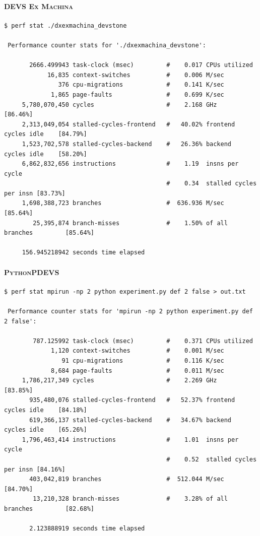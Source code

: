 \documentclass[8pt,a4paper]{report}
\begin{document}
\paragraph{\textsc{DEVS Ex Machina}}
\begin{Verbatim}[fontsize=\small]
$ perf stat ./dxexmachina_devstone 

 Performance counter stats for './dxexmachina_devstone':

       2666.499943 task-clock (msec)         #    0.017 CPUs utilized          
            16,835 context-switches          #    0.006 M/sec                  
               376 cpu-migrations            #    0.141 K/sec                  
             1,865 page-faults               #    0.699 K/sec                  
     5,780,070,450 cycles                    #    2.168 GHz                     [86.46%]
     2,313,049,054 stalled-cycles-frontend   #   40.02% frontend cycles idle    [84.79%]
     1,523,702,578 stalled-cycles-backend    #   26.36% backend  cycles idle    [58.20%]
     6,862,832,656 instructions              #    1.19  insns per cycle        
                                             #    0.34  stalled cycles per insn [83.73%]
     1,698,388,723 branches                  #  636.936 M/sec                   [85.64%]
        25,395,874 branch-misses             #    1.50% of all branches         [85.64%]

     156.945218942 seconds time elapsed
\end{Verbatim}
\paragraph{\textsc{PythonPDEVS}}
\begin{Verbatim}[fontsize=\small]
$ perf stat mpirun -np 2 python experiment.py def 2 false > out.txt

 Performance counter stats for 'mpirun -np 2 python experiment.py def 2 false':

        787.125992 task-clock (msec)         #    0.371 CPUs utilized          
             1,120 context-switches          #    0.001 M/sec                  
                91 cpu-migrations            #    0.116 K/sec                  
             8,684 page-faults               #    0.011 M/sec                  
     1,786,217,349 cycles                    #    2.269 GHz                     [83.85%]
       935,480,076 stalled-cycles-frontend   #   52.37% frontend cycles idle    [84.18%]
       619,366,137 stalled-cycles-backend    #   34.67% backend  cycles idle    [65.26%]
     1,796,463,414 instructions              #    1.01  insns per cycle        
                                             #    0.52  stalled cycles per insn [84.16%]
       403,042,819 branches                  #  512.044 M/sec                   [84.70%]
        13,210,328 branch-misses             #    3.28% of all branches         [82.68%]

       2.123888919 seconds time elapsed
\end{Verbatim}
\end{document}
